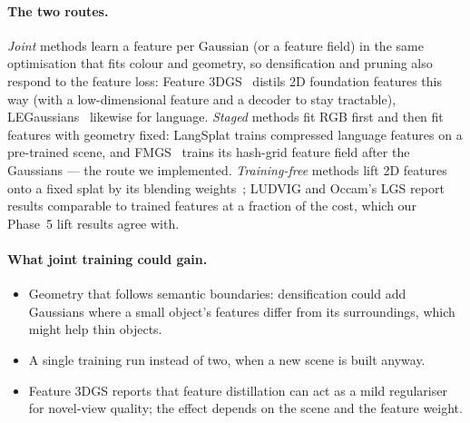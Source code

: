 \documentclass[11pt,a4paper]{article}
\begin{document}
\paragraph{The two routes.} \emph{Joint} methods learn a feature per Gaussian (or a feature field) in the
same optimisation that fits colour and geometry, so densification and pruning also respond to the
feature loss: Feature 3DGS~\cite{feature3dgs} distils 2D foundation features this way (with a
low-dimensional feature and a decoder to stay tractable), LEGaussians~\cite{legaussians} likewise for
language. \emph{Staged} methods fit RGB first and then fit features with geometry fixed: LangSplat
\cite{langsplat} trains compressed language features on a pre-trained scene, and FMGS~\cite{fmgs}
trains its hash-grid feature field after the Gaussians --- the route we implemented. \emph{Training-free}
methods lift 2D features onto a fixed splat by its blending weights~\cite{ludvig,occam}; LUDVIG and
Occam's LGS report results comparable to trained features at a fraction of the cost, which our
Phase~5 lift results agree with.

\paragraph{What joint training could gain.}
\begin{itemize}
  \item Geometry that follows semantic boundaries: densification could add Gaussians where a small
        object's features differ from its surroundings, which might help thin objects.
  \item A single training run instead of two, when a new scene is built anyway.
  \item Feature 3DGS reports that feature distillation can act as a mild regulariser for novel-view
        quality; the effect depends on the scene and the feature weight.
\end{itemize}
\end{document}
